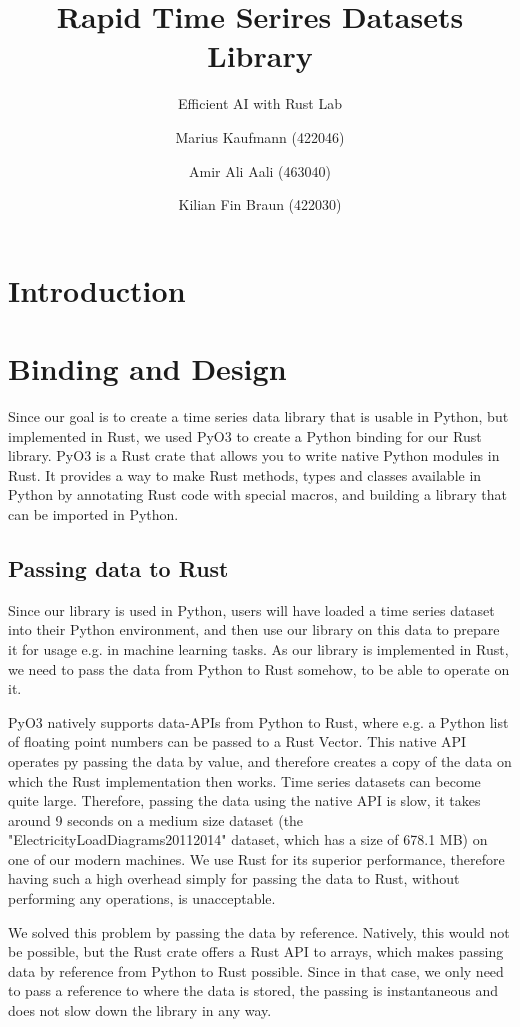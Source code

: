 \documentclass[review]{AIM_report}
\title{Rapid Time Serires Datasets Library}
\subtitle{Efficient AI with Rust Lab}
\author{Marius Kaufmann (422046) \and Amir Ali Aali (463040) \and Kilian Fin Braun (422030)}
\institute{RWTH Aachen University, Germany\\
\email{$\{$amir.ali.aali, marius.kaufmann$\}$@rwth-aachen.de}}
\begin{document}
\maketitle

\tableofcontents
\newpage

\section{Introduction}


\section{Binding and Design}

Since our goal is to create a time series data library that is usable in Python, but implemented in Rust, we used PyO3 to create a Python binding for our Rust library. PyO3 is a Rust crate that allows you to write native Python modules in Rust. It provides a way to make Rust methods, types and classes available in Python by annotating Rust code with special macros, and building a library that can be imported in Python.

\subsection{Passing data to Rust}

Since our library is used in Python, users will have loaded a time series dataset into their Python environment, and then use our library on this data to prepare it for usage e.g. in machine learning tasks. As our library is implemented in Rust, we need to pass the data from Python to Rust somehow, to be able to operate on it.

PyO3 natively supports data-APIs from Python to Rust, where e.g. a Python list of floating point numbers can be passed to a Rust Vector. This native API operates py passing the data by value, and therefore creates a copy of the data on which the Rust implementation then works. Time series datasets can become quite large. Therefore, passing the data using the native API is slow, it takes around 9 seconds on a medium size dataset (the "ElectricityLoadDiagrams20112014" dataset, which has a size of 678.1 MB) on one of our modern machines. We use Rust for its superior performance, therefore having such a high overhead simply for passing the data to Rust, without performing any operations, is unacceptable.

We solved this problem by passing the data by reference. Natively, this would not be possible, but the Rust crate \numpy offers a Rust API to \numpy arrays, which makes passing data by reference from Python to Rust possible. Since in that case, we only need to pass a reference to where the data is stored, the passing is instantaneous and does not slow down the library in any way.
\end{document}
